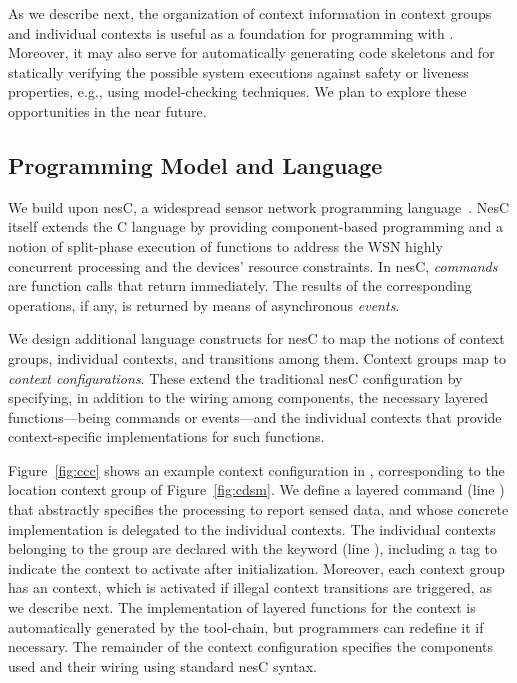 As we describe next, the organization of context information in
context groups and individual contexts is useful as a foundation for
programming with \conesc. Moreover, it may also serve for
automatically generating code skeletons and for statically verifying
the possible system executions against safety or liveness properties,
e.g., using model-checking techniques. We plan to explore these
opportunities in the near future.

\subsection{Programming Model and Language}

We build upon nesC, a widespread sensor network programming
language~\cite{gay03:nesc}. NesC itself extends the C language by
providing component-based programming and a notion of split-phase
execution of functions to address the WSN highly concurrent processing
and the devices' resource constraints. In nesC, \emph{commands} are
function calls that return immediately. The results of the
corresponding operations, if any, is returned by means of asynchronous
\emph{events}.

We design additional language constructs for nesC to map the notions
of context groups, individual contexts, and transitions among
them. Context groups map to \emph{context configurations}. These
extend the traditional nesC configuration by specifying, in addition
to the wiring among components, the necessary layered
functions---being commands or events---and the individual contexts
that provide context-specific implementations for such functions.

Figure~\ref{fig:ccc} shows an example context configuration in
\conesc, corresponding to the location context group of
Figure~\ref{fig:cdsm}. We define a layered {} command
(line ) that abstractly specifies the processing to
report sensed data, and whose concrete implementation is delegated to
the individual contexts. The individual contexts belonging to the
group are declared with the keyword {} (line
), including a tag {} to indicate
the context to activate after initialization. Moreover, each context
group has an {} context, which is activated if illegal
context transitions are triggered, as we describe next. The
implementation of layered functions for the {} context
is automatically generated by the \conesc tool-chain, but programmers can
redefine it if necessary. The remainder of the context configuration
specifies the components used and their wiring using standard nesC
syntax.

